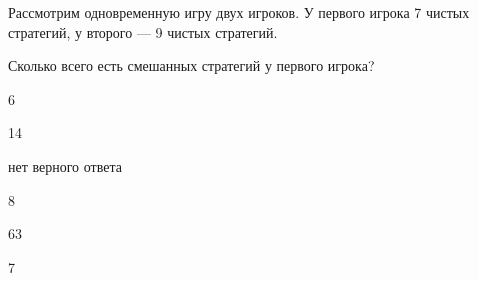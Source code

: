 
\begin{question}
Рассмотрим одновременную игру двух игроков.
У первого игрока 7 чистых стратегий, у второго --- 9 чистых стратегий.

Сколько всего есть смешанных стратегий у первого игрока?
\begin{answerlist}
  \item 6
  \item 14
  \item нет верного ответа
  \item 8
  \item 63
  \item 7
\end{answerlist}
\end{question}



